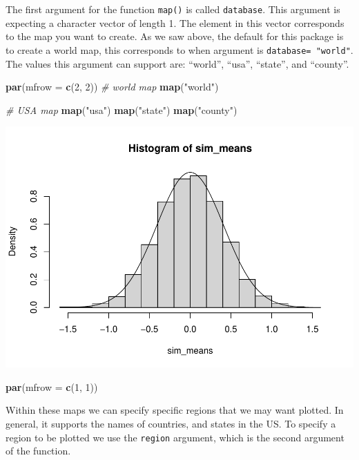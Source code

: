 \documentclass[
]{book}
\newenvironment{Shaded}{\begin{snugshade}}{\end{snugshade}}
\newcommand{\CommentTok}[1]{\textcolor[rgb]{0.56,0.35,0.01}{\textit{#1}}}
\newcommand{\DataTypeTok}[1]{\textcolor[rgb]{0.13,0.29,0.53}{#1}}
\newcommand{\DecValTok}[1]{\textcolor[rgb]{0.00,0.00,0.81}{#1}}
\newcommand{\KeywordTok}[1]{\textcolor[rgb]{0.13,0.29,0.53}{\textbf{#1}}}
\newcommand{\NormalTok}[1]{#1}
\newcommand{\StringTok}[1]{\textcolor[rgb]{0.31,0.60,0.02}{#1}}
\begin{document}
The first argument for the function \texttt{map()} is called \texttt{database}. This argument is expecting a character vector of length 1. The element in this vector corresponds to the map you want to create. As we saw above, the default for this package is to create a world map, this corresponds to when argument is \texttt{database=\ "world"}. The values this argument can support are: ``world'', ``usa'', ``state'', and ``county''.

\begin{Shaded}
\begin{Highlighting}[]
\KeywordTok{par}\NormalTok{(}\DataTypeTok{mfrow =} \KeywordTok{c}\NormalTok{(}\DecValTok{2}\NormalTok{, }\DecValTok{2}\NormalTok{))}
\CommentTok{# world map}
\KeywordTok{map}\NormalTok{(}\StringTok{"world"}\NormalTok{)}

\CommentTok{# USA map}
\KeywordTok{map}\NormalTok{(}\StringTok{"usa"}\NormalTok{)}
\KeywordTok{map}\NormalTok{(}\StringTok{"state"}\NormalTok{)}
\KeywordTok{map}\NormalTok{(}\StringTok{"county"}\NormalTok{)}
\end{Highlighting}
\end{Shaded}

\includegraphics{_main_files/figure-latex/unnamed-chunk-256-1.pdf}

\begin{Shaded}
\begin{Highlighting}[]
\KeywordTok{par}\NormalTok{(}\DataTypeTok{mfrow =} \KeywordTok{c}\NormalTok{(}\DecValTok{1}\NormalTok{, }\DecValTok{1}\NormalTok{))}
\end{Highlighting}
\end{Shaded}

Within these maps we can specify specific regions that we may want plotted. In general, it supports the names of countries, and states in the US. To specify a region to be plotted we use the \texttt{region} argument, which is the second argument of the function.
\end{document}

